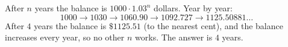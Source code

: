 After $n$ years the balance is $1000\cdot1.03^n$ dollars. Year by year:
\[1000\to1030\to1060.90\to1092.727\to1125.50881\ldots\]
After $4$ years the balance is $\$1125.51$ (to the nearest cent), and the balance increases every year, so no other $n$ works. The answer is $\boxed{4}$ years.
